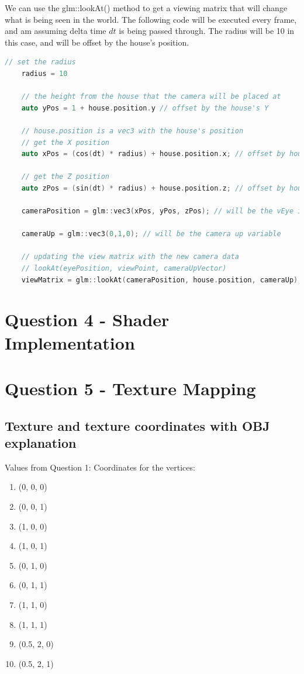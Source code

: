 \documentclass[10pt]{report}
\begin{document}
We can use the glm::lookAt() method to get a viewing matrix that will change what is being seen in the world. The following code will be executed every frame, and am assuming delta time \(dt\) is being passed through. The radius will be 10 in this case, and will be offset by the house's position.

\begin{lstlisting}[language = c]
    // set the radius
    radius = 10

    // the height from the house that the camera will be placed at
    auto yPos = 1 + house.position.y // offset by the house's Y

    // house.position is a vec3 with the house's position
    // get the X position 
    auto xPos = (cos(dt) * radius) + house.position.x; // offset by house's X

    // get the Z position
    auto zPos = (sin(dt) * radius) + house.position.z; // offset by house's Z

    cameraPosition = glm::vec3(xPos, yPos, zPos); // will be the vEye in the lookAt

    cameraUp = glm::vec3(0,1,0); // will be the camera up variable

    // updating the view matrix with the new camera data
    // lookAt(eyePosition, viewPoint, cameraUpVector)
    viewMatrix = glm::lookAt(cameraPosition, house.position, cameraUp);

\end{lstlisting}


\chapter{Question 4 - Shader Implementation}


\chapter{Question 5 - Texture Mapping}

\section{Texture and texture coordinates with OBJ explanation}

Values from Question 1:
Coordinates for the vertices:
\begin{enumerate}[(1)]
    \item (0, 0, 0) %
    \item (0, 0, 1) %
    \item (1, 0, 0) %
    \item (1, 0, 1) %
    \item (0, 1, 0) %
    \item (0, 1, 1) %
    \item (1, 1, 0) %
    \item (1, 1, 1) %
    \item (0.5, 2, 0) %
    \item (0.5, 2, 1) %
\end{enumerate}
\end{document}
